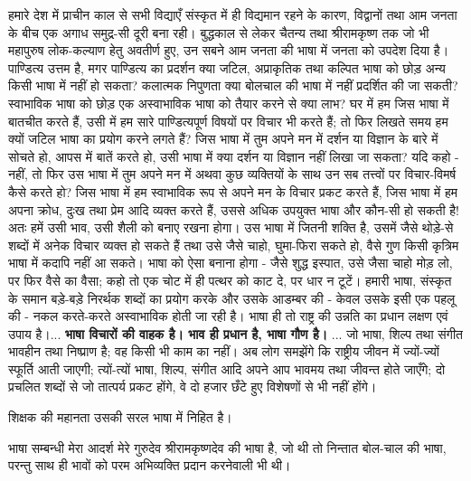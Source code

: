हमारे देश में प्राचीन काल से सभी विद्याएँ संस्कृत में ही विद्यमान रहने के कारण, विद्वानों तथा आम जनता के बीच एक अगाध समुद्र-सी दूरी बना रही। बुद्धकाल से लेकर चैतन्य तथा श्रीरामकृष्ण तक जो भी महापुरुष लोक-कल्याण हेतु अवतीर्ण हुए, उन सबने आम जनता की भाषा में जनता को उपदेश दिया है। पाण्डित्य उत्तम है, मगर पाण्डित्य का प्रदर्शन क्या जटिल, अप्राकृतिक तथा कल्पित भाषा को छोड़ अन्य किसी भाषा में नहीं हो सकता? कलात्मक निपुणता क्या बोलचाल की भाषा में नहीं प्रदर्शित की जा सकती? स्वाभाविक भाषा को छोड़ एक अस्वाभाविक भाषा को तैयार करने से क्या लाभ? घर में हम जिस भाषा में बातचीत करते हैं, उसी में हम सारे पाण्डित्यपूर्ण विषयों पर विचार भी करते हैं; तो फिर लिखते समय हम क्यों जटिल भाषा का प्रयोग करने लगते हैं? जिस भाषा में तुम अपने मन में दर्शन या विज्ञान के बारे में सोचते हो, आपस में बातें करते हो, उसी भाषा में क्या दर्शन या विज्ञान नहीं लिखा जा सकता? यदि कहो - नहीं, तो फिर उस भाषा में तुम अपने मन में अथवा कुछ व्यक्तियों के साथ उन सब तत्त्वों पर विचार-विमर्ष कैसे करते हो? जिस भाषा में हम स्वाभाविक रूप से अपने मन के विचार प्रकट करते हैं, जिस भाषा में हम अपना क्रोध, दुःख तथा प्रेम आदि व्यक्त करते हैं, उससे अधिक उपयुक्त भाषा और कौन-सी हो सकती है! अतः हमें उसी भाव, उसी शैली को बनाए रखना होगा। उस भाषा में जितनी शक्ति है, उसमें जैसे थोड़े-से शब्दों में अनेक विचार व्यक्त हो सकते हैं तथा उसे जैसे चाहो, घुमा-फिरा सकते हो, वैसे गुण किसी कृत्रिम भाषा में कदापि नहीं आ सकते। भाषा को ऐसा बनाना होगा - जैसे शुद्ध इस्पात, उसे जैसा चाहो मोड़ लो, पर फिर वैसे का वैसा; कहो तो एक चोट में ही पत्थर को काट दे, पर धार न टूटें। हमारी भाषा, संस्कृत के समान बड़े-बड़े निरर्थक शब्दों का प्रयोग करके और उसके आडम्बर की - केवल उसके इसी एक पहलू की - नकल करते-करते अस्वाभाविक होती जा रही है। भाषा ही तो राष्ट्र की उन्नति का प्रधान लक्षण एवं उपाय है।... \textbf{भाषा विचारों की वाहक है। भाव ही प्रधान है, भाषा गौण है। }... जो भाषा, शिल्प तथा संगीत भावहीन तथा निष्प्राण है; वह किसी भी काम का नहीं। अब लोग समझेंगे कि राष्ट्रीय जीवन में ज्यों-ज्यों स्फूर्ति आती जाएगी; त्यों-त्यों भाषा, शिल्प, संगीत आदि अपने आप भावमय तथा जीवन्त होते जाएँगे; दो प्रचलित शब्दों से जो तात्पर्य प्रकट होंगे, वे दो हजार छँटे हुए विशेषणों से भी नहीं होंगे। 

शिक्षक की महानता उसकी सरल भाषा में निहित है। 

भाषा सम्बन्धी मेरा आदर्श मेरे गुरुदेव श्रीरामकृष्णदेव की भाषा है, जो थी तो निन्तात बोल-चाल की भाषा, परन्तु साथ ही भावों को परम अभिव्यक्ति प्रदान करनेवाली भी थी। 

\delimiter

\addtoendnotes{\protect\end{multicols}}


